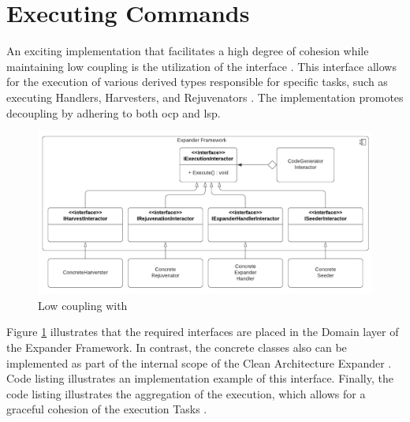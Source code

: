 \section{Executing Commands} \label{subsec_IExecutionInteractorObject}

An exciting implementation that facilitates a high degree of cohesion while maintaining
low coupling is the utilization of the  interface
\parencite{koks_iexecutioninteractor_2023}. This interface allows for the execution of
various derived types responsible for specific tasks, such as executing Handlers,
Harvesters, and Rejuvenators \parencites{koks_expandentitieshandlerinteractor_2023,
koks_regionharvesterinteractor_2023, koks_regionrejuvenatorinteractor_2023}. The
implementation promotes decoupling by adhering to both \gls{ocp} and \gls{lsp}.

\begin{figure}[H]
    \centering
    \includegraphics[width=1\textwidth]{figures/command_pattern.pdf}
    \caption[Low coupling with ]{Low coupling with }
    \label{fig_iexecutioninteractor}
  \end{figure}


Figure \ref{fig_iexecutioninteractor} illustrates that the required interfaces are placed
in the Domain layer of the Expander Framework. In contrast, the concrete classes also can
be implemented as part of the internal scope of the Clean Architecture Expander
\parencite{koks_migrationharvesterinteractor_2023}. Code listing
 illustrates an implementation example of
this interface. Finally, the code listing 
illustrates the aggregation of the execution, which allows for a graceful cohesion of the
execution Tasks \parencite{koks_codegeneratorinteractor_2023}.
